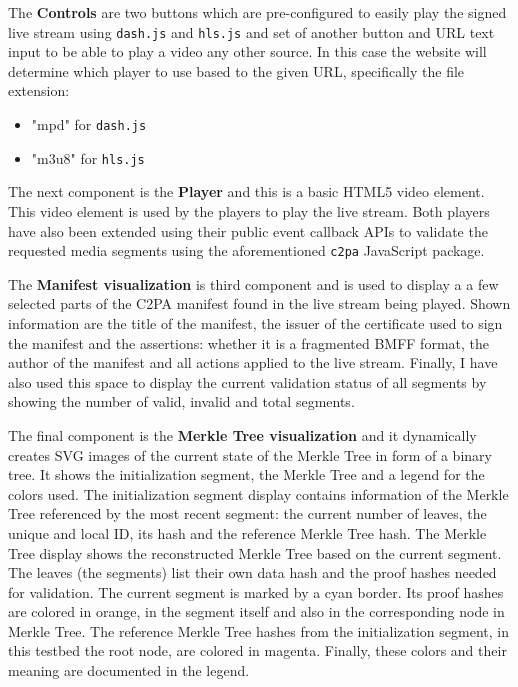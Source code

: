 
The \textbf{Controls} are two buttons which are pre-configured to easily play the signed live stream using \texttt{dash.js} and \texttt{hls.js} and set of another button and URL text input to be able to play a video any other source. In this case the website will determine which player to use based to the given URL, specifically the file extension:

\begin{itemize}
    \item "mpd" for \texttt{dash.js}
    \item "m3u8" for \texttt{hls.js}
\end{itemize}

The next component is the \textbf{Player} and this is a basic HTML5 video element. This video element is used by the players to play the live stream. Both players have also been extended using their public event callback APIs to validate the requested media segments using the aforementioned \texttt{c2pa} JavaScript package.

The \textbf{Manifest visualization} is third component and is used to display a a few selected parts of the C2PA manifest found in the live stream being played. Shown information are the title of the manifest, the issuer of the certificate used to sign the manifest and the assertions: whether it is a fragmented BMFF format, the author of the manifest and all actions applied to the live stream. Finally, I have also used this space to display the current validation status of all segments by showing the number of valid, invalid and total segments.

The final component is the \textbf{Merkle Tree visualization} and it dynamically creates SVG images of the current state of the Merkle Tree in form of a binary tree. It shows the initialization segment, the Merkle Tree and a legend for the colors used. The initialization segment display contains information of the Merkle Tree referenced by the most recent segment: the current number of leaves, the unique and local ID, its hash and the reference Merkle Tree hash. The Merkle Tree display shows the reconstructed Merkle Tree based on the current segment. The leaves (the segments) list their own data hash and the proof hashes needed for validation. The current segment is marked by a cyan border. Its proof hashes are colored in orange, in the segment itself and also in the corresponding node in Merkle Tree. The reference Merkle Tree hashes from the initialization segment, in this testbed the root node, are colored in magenta. Finally, these colors and their meaning are documented in the legend.

